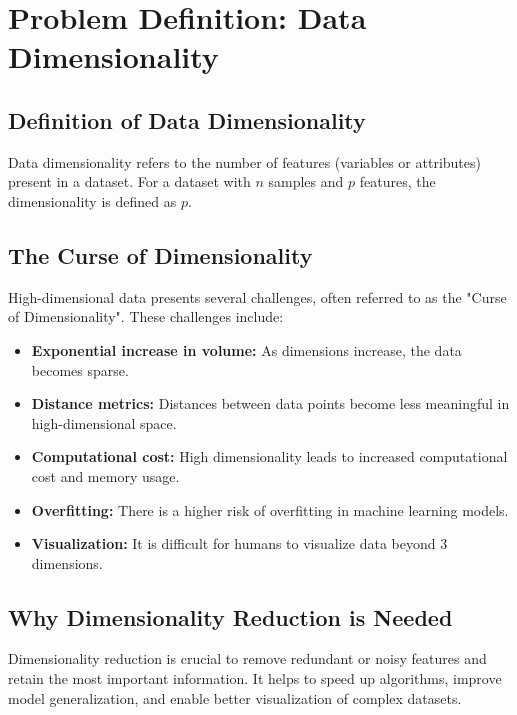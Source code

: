 \documentclass[12pt, a4paper]{report}
\begin{document}
\section{Problem Definition: Data Dimensionality}

\subsection{Definition of Data Dimensionality}
Data dimensionality refers to the number of features (variables or attributes) present in a dataset. For a dataset with $n$ samples and $p$ features, the dimensionality is defined as $p$.

\subsection{The Curse of Dimensionality}
High-dimensional data presents several challenges, often referred to as the "Curse of Dimensionality". These challenges include:
\begin{itemize}
    \item \textbf{Exponential increase in volume:} As dimensions increase, the data becomes sparse.
    \item \textbf{Distance metrics:} Distances between data points become less meaningful in high-dimensional space.
    \item \textbf{Computational cost:} High dimensionality leads to increased computational cost and memory usage.
    \item \textbf{Overfitting:} There is a higher risk of overfitting in machine learning models.
    \item \textbf{Visualization:} It is difficult for humans to visualize data beyond 3 dimensions.
\end{itemize}

\subsection{Why Dimensionality Reduction is Needed}
Dimensionality reduction is crucial to remove redundant or noisy features and retain the most important information. It helps to speed up algorithms, improve model generalization, and enable better visualization of complex datasets.
\end{document}
